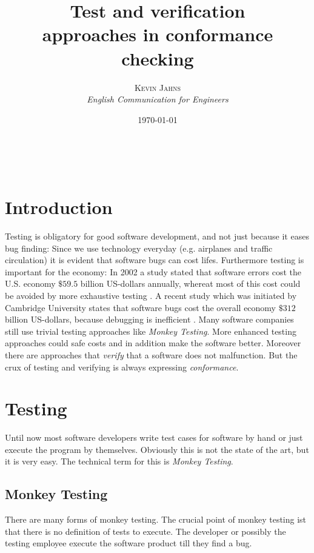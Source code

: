\documentclass[a4paper, 12pt]{article} %
\title{\textbf{Test and verification}\\ %
approaches in conformance checking} %
\author{\textsc{Kevin Jahns} %
\\{\textit{English Communication for Engineers}}} %
\date{\today} %
\makeatletter
\renewcommand{\maketitle}{ %
\begin{flushright} %
{\LARGE\@title} %

\vspace{50pt} %

{\large\@author} %
\\\@date %

\vspace{40pt} %
\end{flushright}
}
\makeatother
\begin{document}
\maketitle %


\section*{Introduction}
Testing is obligatory for good software development, and not just because it
eases bug finding: Since we use technology everyday (e.g. airplanes and traffic
circulation) it is evident that software bugs can cost lifes. Furthermore
testing is important for the economy: In 2002 a study stated that software errors cost the U.S.
economy $ \$59.5$ billion US-dollars annually, whereat most of this cost could
be avoided by more exhaustive testing \cite{nist}. A recent study which was
initiated by Cambridge University states that software bugs cost the 
overall economy $ \$ 312 $  billion US-dollars, because debugging is inefficient
\cite{cambridge_errors}.
Many software companies still use trivial testing approaches like
\textit{Monkey Testing}. More enhanced testing approaches could safe costs and 
in addition make the software better. Moreover there are approaches that 
\textit{verify} that a software does not malfunction. But the crux of
testing and verifying is always expressing \textit{conformance}. 

\section*{Testing}
Until now most software developers write test cases for software by hand or just
execute the program by themselves. Obviously this is not the state of the art, but it is very easy. The
technical term for this is \textit{Monkey Testing}.

\subsection*{Monkey Testing}
There are many forms of monkey testing. The crucial point of monkey testing ist
that there is no definition of tests to execute. The developer or possibly
the testing employee execute the software product till they find a bug. 
\end{document}
